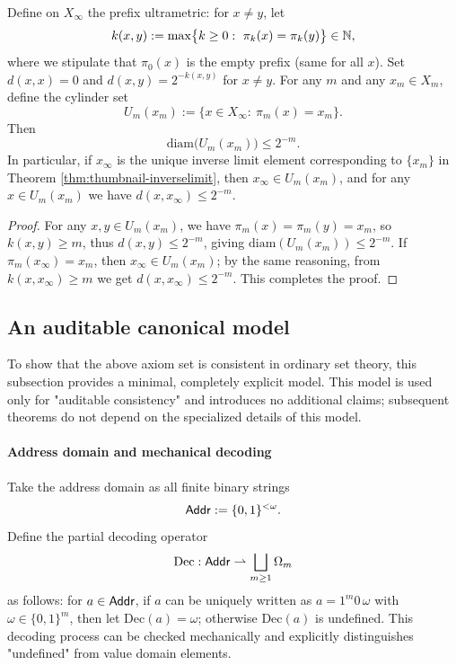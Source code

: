 \begin{corollary}\label{cor:ultrametric-cylinder-diameter}
Define on $X_\infty$ the prefix ultrametric: for $x\neq y$, let
$$
k(x,y):=\max\bigl\{k\ge 0:\ \pi_k(x)=\pi_k(y)\bigr\}\in\NN,
$$
where we stipulate that $\pi_0(x)$ is the empty prefix (same for all $x$). Set $d(x,x)=0$ and $d(x,y)=2^{-k(x,y)}$ for $x\neq y$. For any $m$ and any $x_m\in X_m$, define the cylinder set
$$
U_m(x_m):=\{x\in X_\infty:\ \pi_m(x)=x_m\}.
$$
Then
$$
\mathrm{diam}\bigl(U_m(x_m)\bigr)\le 2^{-m}.
$$
In particular, if $x_\infty$ is the unique inverse limit element corresponding to $\{x_m\}$ in Theorem \ref{thm:thumbnail-inverselimit}, then $x_\infty\in U_m(x_m)$, and for any $x\in U_m(x_m)$ we have $d(x,x_\infty)\le 2^{-m}$.\par
\end{corollary}

\begin{proof}
For any $x,y\in U_m(x_m)$, we have $\pi_m(x)=\pi_m(y)=x_m$, so $k(x,y)\ge m$, thus $d(x,y)\le 2^{-m}$, giving $\mathrm{diam}(U_m(x_m))\le 2^{-m}$. If $\pi_m(x_\infty)=x_m$, then $x_\infty\in U_m(x_m)$; by the same reasoning, from $k(x,x_\infty)\ge m$ we get $d(x,x_\infty)\le 2^{-m}$. This completes the proof.\par
\end{proof}

\subsection{An auditable canonical model}\label{subsec:canonical-model}
To show that the above axiom set is consistent in ordinary set theory, this subsection provides a minimal, completely explicit model. This model is used only for "auditable consistency" and introduces no additional claims; subsequent theorems do not depend on the specialized details of this model.\par

\paragraph{Address domain and mechanical decoding}
Take the address domain as all finite binary strings
$$
\mathsf{Addr}:=\{0,1\}^{<\omega}.
$$
Define the partial decoding operator
$$
\mathrm{Dec}:\mathsf{Addr}\rightharpoonup \bigsqcup_{m\ge 1}\Omega_m
$$
as follows: for $a\in\mathsf{Addr}$, if $a$ can be uniquely written as $a=1^m 0\,\omega$ with $\omega\in\{0,1\}^m$, then let $\mathrm{Dec}(a)=\omega$; otherwise $\mathrm{Dec}(a)$ is undefined. This decoding process can be checked mechanically and explicitly distinguishes "undefined" from value domain elements.\par

